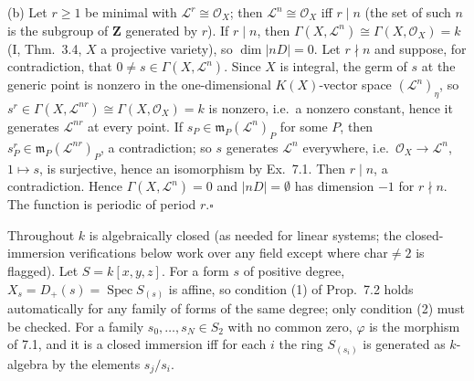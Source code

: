 \documentclass[11pt]{article}
\begin{document}
(b) Let $r\ge1$ be minimal with $\mathcal L^r\cong\mathcal O_X$; then $\mathcal L^n\cong\mathcal O_X$ iff $r\mid n$ (the set of such $n$ is the subgroup of $\mathbf Z$ generated by $r$). If $r\mid n$, then $\Gamma(X,\mathcal L^n)\cong\Gamma(X,\mathcal O_X)=k$ (I, Thm.~3.4, $X$ a projective variety), so $\dim|nD|=0$. Let $r\nmid n$ and suppose, for contradiction, that $0\ne s\in\Gamma(X,\mathcal L^n)$. Since $X$ is integral, the germ of $s$ at the generic point is nonzero in the one-dimensional $K(X)$-vector space $(\mathcal L^n)_\eta$, so $s^r\in\Gamma(X,\mathcal L^{nr})\cong\Gamma(X,\mathcal O_X)=k$ is nonzero, i.e.\ a nonzero constant, hence it generates $\mathcal L^{nr}$ at every point. If $s_P\in\mathfrak m_P(\mathcal L^n)_P$ for some $P$, then $s^r_P\in\mathfrak m_P(\mathcal L^{nr})_P$, a contradiction; so $s$ generates $\mathcal L^n$ everywhere, i.e.\ $\mathcal O_X\to\mathcal L^n$, $1\mapsto s$, is surjective, hence an isomorphism by Ex.~7.1. Then $r\mid n$, a contradiction. Hence $\Gamma(X,\mathcal L^n)=0$ and $|nD|=\emptyset$ has dimension $-1$ for $r\nmid n$. The function is periodic of period $r$.\hfill$\square$

\pf
Throughout $k$ is algebraically closed (as needed for linear systems; the closed-immersion verifications below work over any field except where char${}\ne2$ is flagged). Let $S=k[x,y,z]$. For a form $s$ of positive degree, $X_s=D_+(s)=\operatorname{Spec}S_{(s)}$ is affine, so condition (1) of Prop.~7.2 holds automatically for any family of forms of the same degree; only condition (2) must be checked. For a family $s_0,\dots,s_N\in S_2$ with no common zero, $\varphi$ is the morphism of 7.1, and it is a closed immersion iff for each $i$ the ring $S_{(s_i)}$ is generated as $k$-algebra by the elements $s_j/s_i$.
\end{document}
